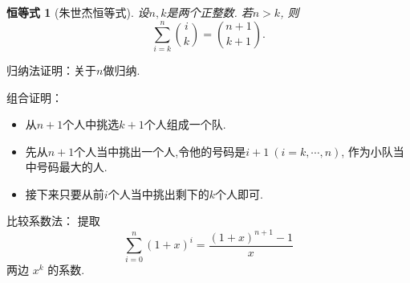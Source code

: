 \documentclass[punct]{ctexbeamer}
\newtheorem{iden}{恒等式}
\begin{document}
\begin{frame}

    \begin{iden}[朱世杰恒等式]
        设$n,k$是两个正整数.
        若$n>k$, 则	$$\sum_{i=k}^{n}\binom{i}{k}=\binom{n+1}{k+1}.$$
    \end{iden}
    \pause
       归纳法证明：关于$n$做归纳.

    组合证明：
    \begin{itemize}
        \item 从$n+1$个人中挑选$k+1$个人组成一个队.
        \item 先从$n+1$个人当中挑出一个人,令他的号码是$i+1\ (i= k, \cdots, n)$,
        作为小队当中号码最大的人.

        \item 接下来只要从前$i$个人当中挑出剩下的$k$个人即可.
    \end{itemize}

    比较系数法：
    提取 $$\sum_{i=0}^{n}(1+x)^{i}= \frac{(1+x)^{n+1}-1}{x}$$ 两边 $x^{k}$ 的系数.
\end{frame}
\end{document}
